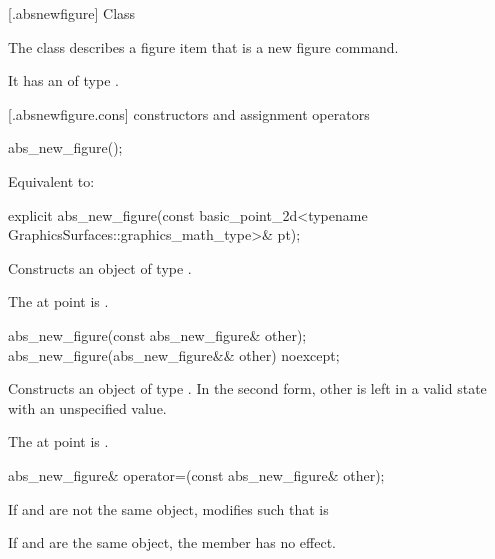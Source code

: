 [\iotwod.absnewfigure] {Class }

\pnum
{}%
The class  describes a figure item that is a new figure command.

\pnum
It has an  of type .

 [\iotwod.absnewfigure.cons] { constructors and assignment operators}%

%
\begin{itemdecl}
abs_new_figure();
\end{itemdecl}
\begin{itemdescr}
\pnum
\effects
Equivalent to: 
\end{itemdescr}

%
\begin{itemdecl}
explicit abs_new_figure(const basic_point_2d<typename GraphicsSurfaces::graphics_math_type>& pt);
\end{itemdecl}
\begin{itemdescr}
\pnum
\effects
Constructs an object of type .

\pnum
The at point is .
\end{itemdescr}

%
\begin{itemdecl}
abs_new_figure(const abs_new_figure& other);
abs_new_figure(abs_new_figure&& other) noexcept;
\end{itemdecl}
\begin{itemdescr}
\pnum
\effects
Constructs an object of type . In the second form, other is left in a valid state with an unspecified value.
	
\pnum
The at point is .
\end{itemdescr}

%
\begin{itemdecl}
abs_new_figure& operator=(const abs_new_figure& other);
\end{itemdecl}
\begin{itemdescr}
\pnum
\effects
If  and  are not the same object, modifies  such that  is 

\pnum
If  and  are the same object, the member has no effect.
	
\pnum
\returns
{}
\end{itemdescr}

